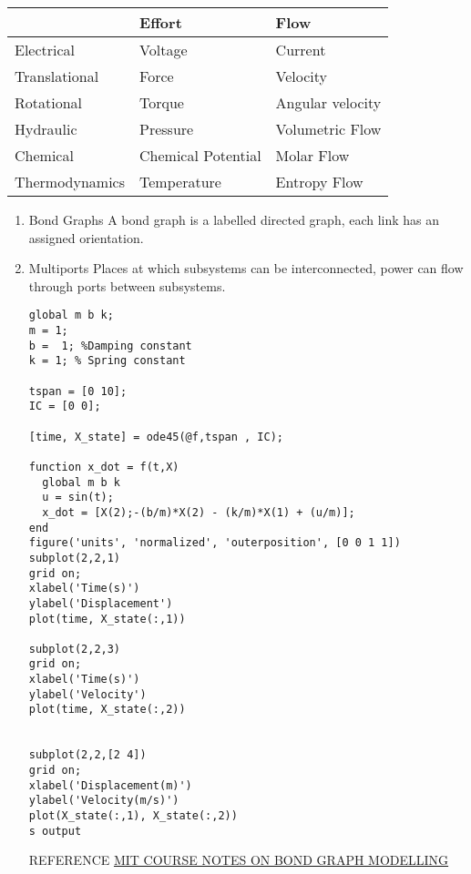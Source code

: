 \documentclass[11pt]{report}
\begin{document}
\begin{center}
\begin{tabular}{lll}
\hline
 & Effort & Flow\\
\hline
Electrical & Voltage & Current\\
Translational & Force & Velocity\\
Rotational & Torque & Angular velocity\\
Hydraulic & Pressure & Volumetric Flow\\
Chemical & Chemical Potential & Molar Flow\\
Thermodynamics & Temperature & Entropy Flow\\
\hline
\end{tabular}
\end{center}
\begin{enumerate}
\item Bond Graphs
\label{sec:org09d3aea}
A bond graph is a labelled directed graph, each link has an assigned orientation.
\item Multiports
\label{sec:orgc12cc4b}
Places at which subsystems can be interconnected, power can flow through ports between subsystems.

\begin{verbatim}
global m b k;
m = 1;
b =  1; %Damping constant
k = 1; % Spring constant

tspan = [0 10];
IC = [0 0];

[time, X_state] = ode45(@f,tspan , IC);

function x_dot = f(t,X)
  global m b k
  u = sin(t);
  x_dot = [X(2);-(b/m)*X(2) - (k/m)*X(1) + (u/m)];
end
figure('units', 'normalized', 'outerposition', [0 0 1 1])
subplot(2,2,1)
grid on;
xlabel('Time(s)')
ylabel('Displacement')
plot(time, X_state(:,1))

subplot(2,2,3)
grid on;
xlabel('Time(s)')
ylabel('Velocity')
plot(time, X_state(:,2))


subplot(2,2,[2 4])
grid on;
xlabel('Displacement(m)')
ylabel('Velocity(m/s)')
plot(X_state(:,1), X_state(:,2))
s output
\end{verbatim}

REFERENCE
\href{https://ocw.mit.edu/courses/2-141-modeling-and-simulation-of-dynamic-systems-fall-2006/71ca8916669d0aa6839ce780db9f5288\_bond\_graph\_intro.pdf}{MIT COURSE NOTES ON BOND GRAPH MODELLING}
\end{enumerate}
\end{document}
